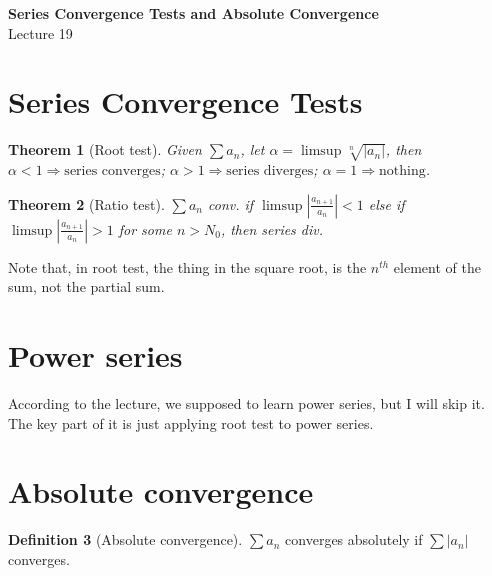 \documentclass[12pt]{article}
\newcommand{\abs}[1]{\left|#1\right|}
\theoremstyle{definition}
\newtheorem{definition}{Definition}[section]
\theoremstyle{plain}
\newtheorem{theorem}[definition]{Theorem}
\begin{document}

\begin{center}
    {\Large \textbf{Series Convergence Tests and Absolute Convergence}}\\[0.5em]
    {\large Lecture 19}
\end{center}

\tableofcontents

\newpage

\section{Series Convergence Tests}

\begin{theorem}[Root test]
Given $\sum a_n$, let $\alpha =\limsup\sqrt[n]{\abs{a_n}}$, then $\alpha <1 \Rightarrow \text{series converges}$; $\alpha >1 \Rightarrow \text{series diverges}$; $\alpha =1 \Rightarrow \text{nothing}$.
\end{theorem}

\begin{theorem}[Ratio test]
$\sum a_n$ conv. if $\limsup \abs{\frac{a_{n+1}}{a_n}}<1$ else if $\limsup \abs{\frac{a_{n+1}}{a_n}}>1$ for some $n > N_0$, then series div.
\end{theorem}

\begin{note}
Note that, in root test, the thing in the square root, is the $n^{th}$ element of the sum, not the partial sum.
\end{note}

\section{Power series}

\begin{note}
According to the lecture, we supposed to learn power series, but I will skip it. The key part of it is just applying root test to power series.
\end{note}

\section{Absolute convergence}

\begin{definition}[Absolute convergence]
$\sum a_n$ converges absolutely if $\sum \abs{a_n}$ converges.
\end{definition}
\end{document}
